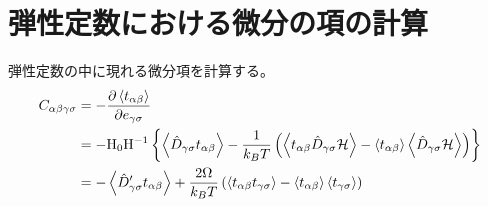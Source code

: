 \documentclass[11pt,a4paper,uplatex]{jsarticle}
\begin{document}
\section{弾性定数における微分の項の計算}
弾性定数の中に現れる微分項を計算する。
\begin{align}
    C_{\alpha \beta \gamma \sigma} &= -\frac{\partial \left< t_{\alpha \beta} \right>}{\partial e_{\gamma \sigma}} \\
    &= - {\rm H_{0} H^{-1}} \left\{ \left<\hat{D}_{\gamma \sigma} t_{\alpha \beta} \right> - \frac{1}{k_{B}T} \left( \left<t_{\alpha \beta} \hat{D}_{\gamma \sigma} {\cal H}\right> - \left< t_{\alpha \beta} \right>\left< \hat{D}_{\gamma \sigma} {\cal H}\right>\right) \right\} \\
    &= -\left< \hat{D}_{\gamma \sigma}' t_{\alpha \beta}\right> + \frac{2\Omega}{k_{B} T} \left(\left<t_{\alpha \beta} t_{\gamma \sigma}\right> - \left<t_{\alpha \beta}\right>\left<t_{\gamma \sigma}\right>\right)
\end{align}
\end{document}
